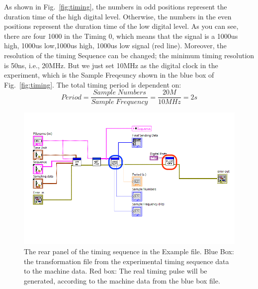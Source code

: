 \documentclass{article}
\begin{document}
As shown in Fig.~\ref{fig:timing}, the numbers in odd positions represent the duration time of the high digital level. Otherwise, the numbers in the even positions represent the duration time of the low digital level. As you can see, there are four 1000 in the Timing 0, which means that the signal is a 1000us high, 1000us low,1000us high, 1000us low signal (red 
 line).  Moreover, the resolution of the timing Sequence can be changed; the minimum timing resolution is 50ns, i.e., 20MHz. But we just set 10MHz as the digital clock in the experiment, which is the Sample Freqeuncy shown in the blue box of Fig.~\ref{fig:timing}. The total timing period is dependent on:
 \begin{equation}
     Period = \frac{Sample\; Numbers}{Sample \;Frequency}=\frac{20M}{10MHz} = 2s
 \end{equation}
 \begin{figure}[htbp]
    \centering
    \includegraphics[width=1\linewidth]{fig/Example for Timing sequence.png}
    \caption{The rear panel of the timing sequence in the Example file. Blue Box: the transformation file from the experimental timing sequence data to the machine data. Red box: The real timing pulse will be generated, according to the machine data from the blue box file.}
    \label{fig:rear panel}
\end{figure}
\end{document}
